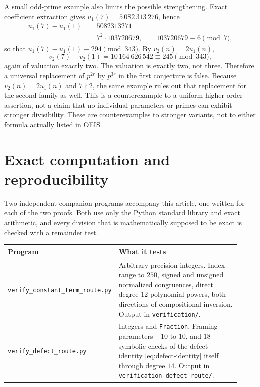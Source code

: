 \documentclass[11pt,letterpaper]{article}
\numberwithin{equation}{section}
\theoremstyle{definition}
\begin{document}
A small odd-prime example also limits the possible strengthening. Exact
coefficient extraction gives $u_1(7)=5\,082\,313\,276$, hence
\begin{equation}\label{eq:sharpness}
\begin{aligned}
u_1(7)-u_1(1)
&=5082313271\\
&=7^2\cdot103720679,
\qquad103720679\equiv6\pmod7,
\end{aligned}
\end{equation}
so that $u_1(7)-u_1(1)\equiv294\pmod{343}$. By $v_2(n)=2u_1(n)$,
\[
v_2(7)-v_2(1)=10\,164\,626\,542\equiv245\pmod{343},
\]
again of valuation exactly two.
The valuation is exactly two, not three. Therefore a universal
replacement of $p^{2r}$ by $p^{3r}$ in the first conjecture is false.
Because $v_2(n)=2u_1(n)$ and $7\nmid2$, the same example rules out that
replacement for the second family as well. This is a counterexample to
a uniform higher-order assertion, not a claim that no individual
parameters or primes can exhibit stronger divisibility.
These are counterexamples to stronger variants, not to either formula
actually listed in OEIS.

\section{Exact computation and reproducibility}\label{sec:computation}

Two independent companion programs accompany this article, one written
for each of the two proofs. Both use only the Python standard library and
exact arithmetic, and every division that is mathematically supposed to be
exact is checked with a remainder test.

\begin{center}
\small
\begin{tabular}{p{0.33\linewidth}p{0.59\linewidth}}
\toprule
Program & What it tests\\
\midrule
\texttt{verify\_constant\_term\_}\newline\texttt{route.py} &
Arbitrary-precision integers. Index range to $250$, signed and unsigned
normalized congruences, direct degree-$12$ polynomial powers, both
directions of compositional inversion. Output in \texttt{verification/}.\\
\texttt{verify\_defect\_route.py} &
Integers and \texttt{Fraction}. Framing parameters $-10$ to $10$, and
$18$ symbolic checks of the defect identity
\eqref{eq:defect-identity} itself through degree $14$. Output in
\texttt{verification-defect-route/}.\\
\bottomrule
\end{tabular}
\end{center}
\end{document}
